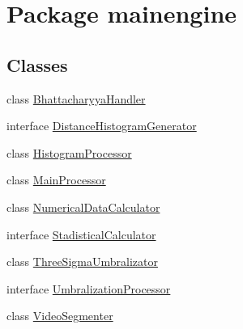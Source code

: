 \hypertarget{namespacemainengine}{}\section{Package mainengine}
\label{namespacemainengine}
\subsection*{Classes}
\begin{DoxyCompactItemize}
\item 
class \hyperlink{classmainengine_1_1_bhattacharyya_handler}{Bhattacharyya\+Handler}
\item 
interface \hyperlink{interfacemainengine_1_1_distance_histogram_generator}{Distance\+Histogram\+Generator}
\item 
class \hyperlink{classmainengine_1_1_histogram_processor}{Histogram\+Processor}
\item 
class \hyperlink{classmainengine_1_1_main_processor}{Main\+Processor}
\item 
class \hyperlink{classmainengine_1_1_numerical_data_calculator}{Numerical\+Data\+Calculator}
\item 
interface \hyperlink{interfacemainengine_1_1_stadistical_calculator}{Stadistical\+Calculator}
\item 
class \hyperlink{classmainengine_1_1_three_sigma_umbralizator}{Three\+Sigma\+Umbralizator}
\item 
interface \hyperlink{interfacemainengine_1_1_umbralization_processor}{Umbralization\+Processor}
\item 
class \hyperlink{classmainengine_1_1_video_segmenter}{Video\+Segmenter}
\end{DoxyCompactItemize}
